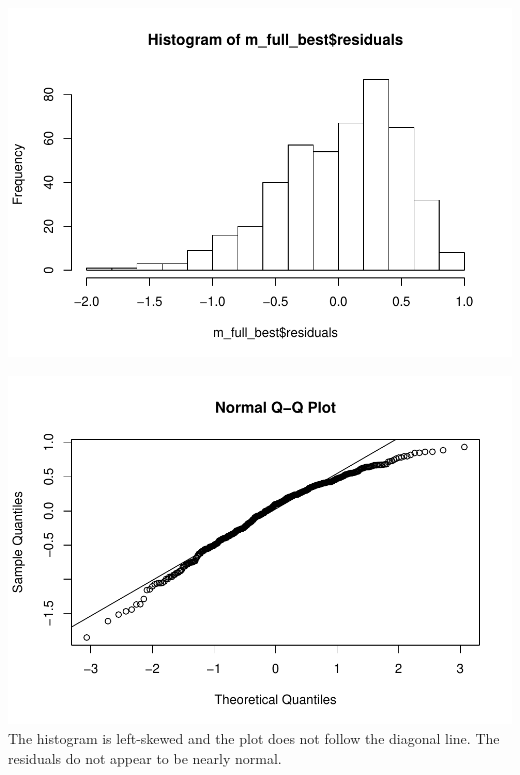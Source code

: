 \documentclass[]{article}
\newenvironment{Shaded}{\begin{snugshade}}{\end{snugshade}}
\newcommand{\KeywordTok}[1]{\textcolor[rgb]{0.13,0.29,0.53}{\textbf{#1}}}
\newcommand{\OperatorTok}[1]{\textcolor[rgb]{0.81,0.36,0.00}{\textbf{#1}}}
\newcommand{\NormalTok}[1]{#1}
\begin{document}
\begin{Shaded}
\end{Shaded}

\includegraphics{multiple_regression_files/figure-latex/quest-16-2.pdf}

\begin{Shaded}
\end{Shaded}

\includegraphics{multiple_regression_files/figure-latex/quest-16-3.pdf}
The histogram is left-skewed and the plot does not follow the diagonal
line. The residuals do not appear to be nearly normal.
\end{document}
